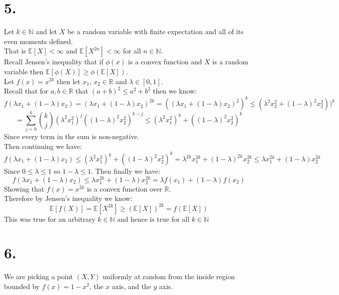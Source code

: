 \documentclass{article}
\begin{document}
\section*{5.}
\begin{center}
\doublespacing
    Let $k\in\mathbb{N}$ and let $X$ be a random variable with finite expectation and all of its even moments defined.
    \\That is $\mathbb{E}[X] <\infty$ and $\mathbb{E}[X^{2n}] <\infty$ for all $n\in\mathbb{N}$.
    \\Recall Jensen's inequality that if $\phi (x)$ is a convex function and $X$ is a random variable then $\mathbb{E}[\phi (X)]\geq\phi (\mathbb{E}[X])$.
    \\Let $f(x) = x^{2k}$ then let $x_1$, $x_2\in\mathbb{R}$ and $\lambda\in [0, 1]$.
    \\Recall that for $a,b\in\mathbb{R}$ that $(a+b)^2\leq a^2 + b^2$ then we know:
    \[f(\lambda x_1 + (1 -\lambda) x_2) = (\lambda x_1 + (1-\lambda) x_2)^{2k} = ((\lambda x_1 + (1-\lambda) x_2)^2)^k\leq(\lambda ^2 x_2^2 + (1 -\lambda)^2 x_2^2))^k\]
    \[=\sum _{j=0}^{k}\binom{k}{j} (\lambda^2 x_1^2)^j((1 -\lambda)^2 x_2^2)^{k-j}\leq (\lambda^2 x_1^2)^k + ((1 -\lambda )^2 x_2^2)^k\]
    Since every term in the sum is non-negative.
    \\Then continuing we have:
    \[f(\lambda x_1 + (1-\lambda) x_2)\leq (\lambda^2 x_1^2)^k + ((1 -\lambda)^2 x_2^2)^k =\lambda^{2k} x_1^{2k} + (1 -\lambda)^{2k} x_2^{2k}\leq\lambda x_1^{2k} + (1 -\lambda) x_2^{2k}\]
    Since $0\leq\lambda\leq 1$ so $1 -\lambda\leq 1$.
    Then finally we have:
    \[f(\lambda x_1 + (1-\lambda) x_2)\leq\lambda x_1^{2k} + (1 -\lambda) x_2^{2k} =\lambda f(x_1) + (1 -\lambda) f(x_2)\]
    Showing that $f(x) = x^{2k}$ is a convex function over $\mathbb{R}$.
    \\Therefore by Jensen's inequality we know:
    \[\mathbb{E}[f(X)] =\mathbb{E}[X^{2k}]\geq (\mathbb{E}[X])^{2k} = f(\mathbb{E}[X])\]
    This was true for an arbitrary $k\in\mathbb{N}$ and hence is true for all $k\in\mathbb{N}$ \qedsymbol
\end{center}


\newpage
\section*{6.}
\begin{center}
    We are picking a point $(X, Y)$ uniformly at random from the inside region bounded by $f(x) = 1 - x^2$, the $x$ axis, and the $y$ axis.
\end{center}
\end{document}
